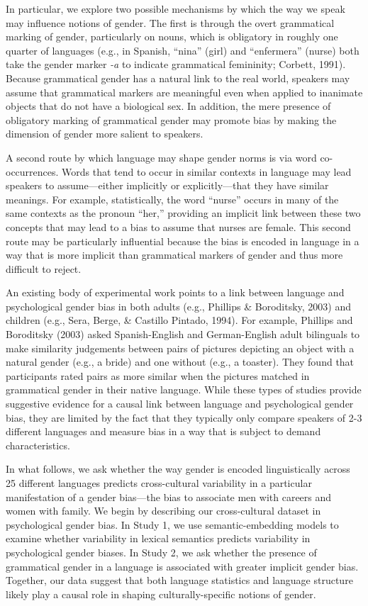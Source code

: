 \documentclass[man,floatsintext]{apa6}
\theoremstyle{definition}
\theoremstyle{definition}
\theoremstyle{definition}
\theoremstyle{remark}
\begin{document}
In particular, we explore two possible mechanisms by which the way we
speak may influence notions of gender. The first is through the overt
grammatical marking of gender, particularly on nouns, which is
obligatory in roughly one quarter of languages (e.g., in Spanish,
``nina'' (girl) and ``enfermera'' (nurse) both take the gender marker
\emph{-a} to indicate grammatical femininity; Corbett, 1991). Because
grammatical gender has a natural link to the real world, speakers may
assume that grammatical markers are meaningful even when applied to
inanimate objects that do not have a biological sex. In addition, the
mere presence of obligatory marking of grammatical gender may promote
bias by making the dimension of gender more salient to speakers.

A second route by which language may shape gender norms is via word
co-occurrences. Words that tend to occur in similar contexts in language
may lead speakers to assume---either implicitly or explicitly---that
they have similar meanings. For example, statistically, the word
\enquote{nurse} occurs in many of the same contexts as the pronoun
\enquote{her,} providing an implicit link between these two concepts
that may lead to a bias to assume that nurses are female. This second
route may be particularly influential because the bias is encoded in
language in a way that is more implicit than grammatical markers of
gender and thus more difficult to reject.

An existing body of experimental work points to a link between language
and psychological gender bias in both adults (e.g., Phillips \&
Boroditsky, 2003) and children (e.g., Sera, Berge, \& Castillo Pintado,
1994). For example, Phillips and Boroditsky (2003) asked Spanish-English
and German-English adult bilinguals to make similarity judgements
between pairs of pictures depicting an object with a natural gender
(e.g., a bride) and one without (e.g., a toaster). They found that
participants rated pairs as more similar when the pictures matched in
grammatical gender in their native language. While these types of
studies provide suggestive evidence for a causal link between language
and psychological gender bias, they are limited by the fact that they
typically only compare speakers of 2-3 different languages and measure
bias in a way that is subject to demand characteristics.

In what follows, we ask whether the way gender is encoded linguistically
across 25 different languages predicts cross-cultural variability in a
particular manifestation of a gender bias---the bias to associate men
with careers and women with family. We begin by describing our
cross-cultural dataset in psychological gender bias. In Study 1, we use
semantic-embedding models to examine whether variability in lexical
semantics predicts variability in psychological gender biases. In Study
2, we ask whether the presence of grammatical gender in a language is
associated with greater implicit gender bias. Together, our data suggest
that both language statistics and language structure likely play a
causal role in shaping culturally-specific notions of gender.
\end{document}
